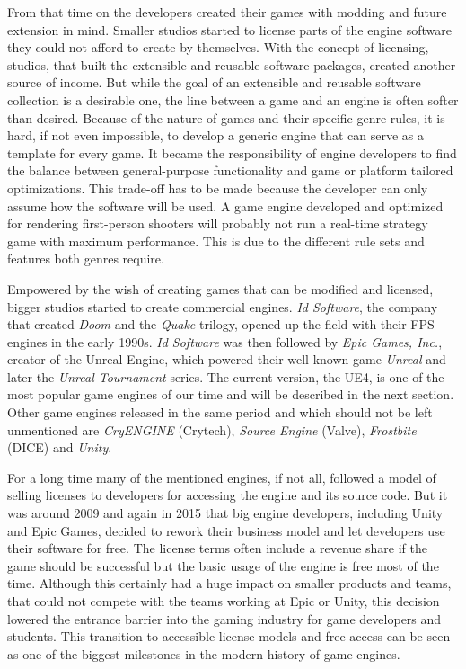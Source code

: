 From that time on the developers created their games with modding and future extension in mind. Smaller studios started to license parts of the engine software they could not afford to create by themselves. With the concept of licensing, studios, that built the extensible and reusable software packages, created another source of income. But while the goal of an extensible and reusable software collection is a desirable one, the line between a game and an engine is often softer than desired. Because of the nature of games and their specific genre rules, it is hard, if not even impossible, to develop a generic engine that can serve as a template for every game. It became the responsibility of engine developers to find the balance between general-purpose functionality and game or platform tailored optimizations. This trade-off has to be made because the developer can only assume how the software will be used. A game engine developed and optimized for rendering first-person shooters will probably not run a real-time strategy game with maximum performance. This is due to the different rule sets and features both genres require.

Empowered by the wish of creating games that can be modified and licensed, bigger studios started to create commercial engines. \textit{Id Software}, the company that created \textit{Doom} and the \textit{Quake} trilogy, opened up the field with their \ac{FPS} engines in the early 1990s. \textit{Id Software} was then followed by \textit{Epic Games, Inc.}, creator of the Unreal Engine, which powered their well-known game \textit{Unreal} and later the \textit{Unreal Tournament} series. The current version, the \ac{UE4}, is one of the most popular game engines of our time and will be described in the next section. Other game engines released in the same period and which should not be left unmentioned are \textit{CryENGINE} (Crytech), \textit{Source Engine} (Valve), \textit{Frostbite} (DICE) and \textit{Unity}.

For a long time many of the mentioned engines, if not all, followed a model of selling licenses to developers for accessing the engine and its source code. But it was around 2009 and again in 2015 that big engine developers, including Unity and Epic Games, decided to rework their business model and let developers use their software for free. \cite{Unity_License} \cite{UE4_License} The license terms often include a revenue share if the game should be successful but the basic usage of the engine is free most of the time. Although this certainly had a huge impact on smaller products and teams, that could not compete with the teams working at Epic or Unity, this decision lowered the entrance barrier into the gaming industry for game developers and students. This transition to accessible license models and free access can be seen as one of the biggest milestones in the modern history of game engines. \cite[p.11-12]{GEA_2}

